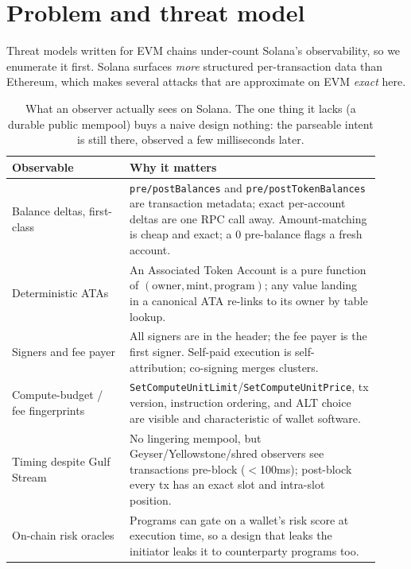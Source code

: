 \documentclass[10pt]{article}
\newcommand{\code}[1]{\texttt{#1}}
\begin{document}
\section{Problem and threat model}
\label{sec:threat}

Threat models written for EVM chains under-count Solana's observability, so we
enumerate it first. Solana surfaces \emph{more} structured per-transaction data
than Ethereum, which makes several attacks that are approximate on EVM
\emph{exact} here.

\begin{table}[h]
\centering
\small
\begin{tabular}{@{}p{0.30\linewidth}p{0.62\linewidth}@{}}
\toprule
\textbf{Observable} & \textbf{Why it matters} \\
\midrule
Balance deltas, first-class & \code{pre/postBalances} and \code{pre/postTokenBalances} are transaction metadata; exact per-account deltas are one RPC call away. Amount-matching is cheap and exact; a $0$ pre-balance flags a fresh account. \\
Deterministic ATAs & An Associated Token Account is a pure function of $(\text{owner},\text{mint},\text{program})$; any value landing in a canonical ATA re-links to its owner by table lookup. \\
Signers and fee payer & All signers are in the header; the fee payer is the first signer. Self-paid execution is self-attribution; co-signing merges clusters. \\
Compute-budget / fee fingerprints & \code{SetComputeUnitLimit}/\code{SetComputeUnitPrice}, tx version, instruction ordering, and ALT choice are visible and characteristic of wallet software. \\
Timing despite Gulf Stream & No lingering mempool, but Geyser/Yellowstone/shred observers see transactions pre-block ($<$100ms); post-block every tx has an exact slot and intra-slot position. \\
On-chain risk oracles & Programs can gate on a wallet's risk score at execution time, so a design that leaks the initiator leaks it to counterparty programs too. \\
\bottomrule
\end{tabular}
\caption{What an observer actually sees on Solana. The one thing it lacks (a
durable public mempool) buys a naive design nothing: the parseable intent is
still there, observed a few milliseconds later.}
\end{table}
\end{document}
